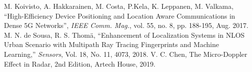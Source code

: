 \begin{thebibliography}{}
    M. Koivisto, A. Hakkarainen, M. Costa, P.Kela, K. Leppanen, M. Valkama, “High-Efficiency Device Positioning and Location Aware Communications in Dense 5G Networks”, \textit{IEEE Comm. Mag.}, vol. 55, no. 8, pp. 188-195, Aug. 2017.
    M. N. de Sousa, R. S. Thomä,  “Enhancement of Localization Systems in NLOS Urban Scenario with Multipath Ray Tracing Fingerprints and Machine Learning,” \textit{Sensors}, Vol. 18, No. 11, 4073, 2018.
    V. C. Chen, The Micro-Doppler Effect in Radar, 2nd Edition, Artech House, 2019.









    

    

    








    
\end{thebibliography}